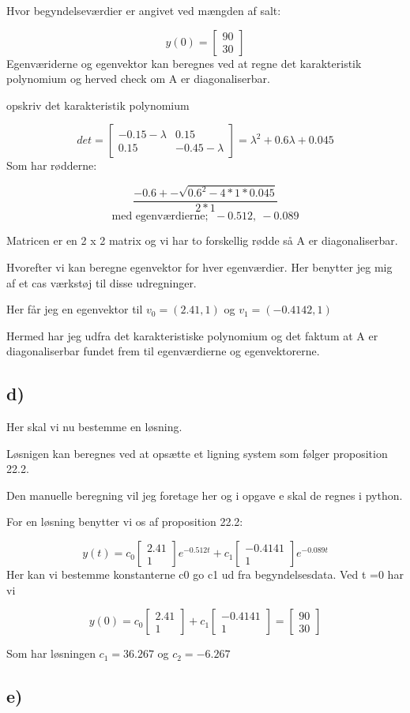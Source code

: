 \documentclass[
]{article}
\begin{document}
Hvor begyndelseværdier er angivet ved mængden af salt:

\[
y(0)=
\begin{bmatrix}
90 \\
30
\end{bmatrix}
\] Egenværiderne og egenvektor kan beregnes ved at regne det
karakteristik polynomium og herved check om A er diagonaliserbar.

opskriv det karakteristik polynomium

\[
det  =
\begin{bmatrix}
-0.15 - \lambda & 0.15 \\
0.15 & -0.45-\lambda
\end{bmatrix}
= \lambda^2+0.6\lambda+0.045
\] Som har rødderne:

\[
\frac{-0.6+-\sqrt{0.6^2-4*1*0.045}}{2*1}
\] \[
\text{med egenværdierne; } \ -0.512, \ -0.089
\]

Matricen er en 2 x 2 matrix og vi har to forskellig rødde så A er
diagonaliserbar.

Hvorefter vi kan beregne egenvektor for hver egenværdier. Her benytter
jeg mig af et cas værkstøj til disse udregninger.

Her får jeg en egenvektor til \(v_0=(2.41,1)\) og \(v_1=(-0.4142,1)\)

Hermed har jeg udfra det karakteristiske polynomium og det faktum at A
er diagonaliserbar fundet frem til egenværdierne og egenvektorerne.

\hypertarget{d}{%
\subsection{d)}\label{d}}

Her skal vi nu bestemme en løsning.

Løsnigen kan beregnes ved at opsætte et ligning system som følger
proposition 22.2.

Den manuelle beregning vil jeg foretage her og i opgave e skal de regnes
i python.

For en løsning benytter vi os af proposition 22.2:

\[
y(t) = c_0 \begin{bmatrix} 2.41 \\ 1\end{bmatrix}e^{-0.512 t} +c_1
\begin{bmatrix} -0.4141 \\ 1\end{bmatrix}e^{-0.089 t}
\] Her kan vi bestemme konstanterne c0 go c1 ud fra begyndelsesdata. Ved
t =0 har vi

\[
y(0)=c_0 \begin{bmatrix} 2.41\\ 1\end{bmatrix}+c_1 \begin{bmatrix} -0.4141\\1 \end{bmatrix}=\begin{bmatrix} 90\\30\end{bmatrix}
\]

Som har løsningen \(c_1=36.267\) og \(c_2=-6.267\)

\hypertarget{e}{%
\subsection{e)}\label{e}}
\end{document}
